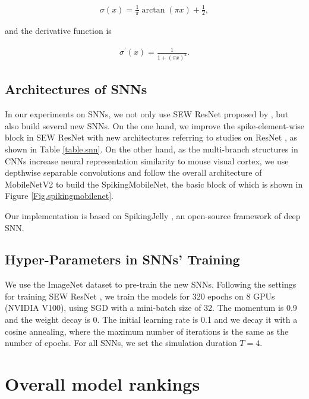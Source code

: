 \documentclass[letterpaper]{article} %
\begin{document}
\begin{align}
	\sigma(x) = \frac{1}{\pi}  \arctan(\pi x) + \frac{1}{2},
\end{align}

and the derivative function is 

\begin{align}
	{\sigma}^{\prime}(x) = \frac{1}{1 + (\pi x)^2}.
\end{align}

\subsection{Architectures of SNNs}

In our experiments on SNNs, we not only use SEW ResNet proposed by \cite{fang2021deep}, but also build several new SNNs. On the one hand, we improve the spike-element-wise block in SEW ResNet with new architectures referring to studies on ResNet \cite{he2016deep, zagoruyko2016wide, xie2017aggregated}, as shown in Table \ref{table.snn}. On the other hand, as the multi-branch structures in CNNs increase neural representation similarity to mouse visual cortex, we use depthwise separable convolutions and follow the overall architecture of MobileNetV2 \cite{howard2017mobilenets, sandler2018mobilenetv2} to build the SpikingMobileNet, the basic block of which is shown in Figure \ref{Fig.spikingmobilenet}.

Our implementation is based on SpikingJelly \cite{SpikingJelly}, an open-source framework of deep SNN.

\subsection{Hyper-Parameters in SNNs' Training}

We use the ImageNet dataset to pre-train the new SNNs. Following the settings for training SEW ResNet \cite{fang2021deep}, we train the models for 320 epochs on 8 GPUs (NVIDIA V100), using SGD with a mini-batch size of 32. The momentum is 0.9 and the weight decay is 0. The initial learning rate is 0.1 and we decay it with a cosine annealing, where the maximum number of iterations is the same as the number of epochs. For all SNNs, we set the simulation duration $T = 4$.  

\section{Overall model rankings}
\label{appendix.overall_rankings}
\end{document}
